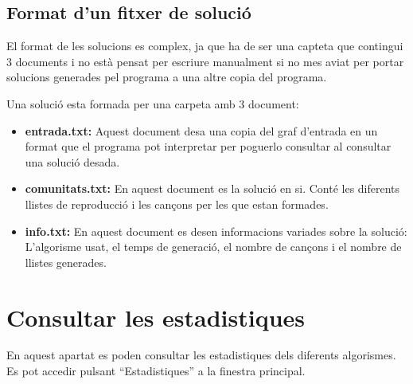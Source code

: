 \documentclass[letterpaper,10pt,oneside]{sphinxmanual}
\begin{document}
\section{Format d'un fitxer de solució}
\label{consult_hist:format-d-un-fitxer-de-solucio}
El format de les solucions es complex, ja que ha de ser una capteta que contingui 3 documents i no està pensat per escriure manualment si no mes aviat per portar solucions generades pel programa a una altre copia del programa.

Una solució esta formada per una carpeta amb 3 document:
\begin{itemize}
\item {} 
\textbf{entrada.txt:} Aquest document desa una copia del graf d'entrada en un format que el programa pot interpretar per poguerlo consultar al consultar una solució desada.

\item {} 
\textbf{comunitats.txt:} En aquest document es la solució en si. Conté les diferents llistes de reproducció i les cançons per les que estan formades.

\item {} 
\textbf{info.txt:} En aquest document es desen informacions variades sobre la solució: L'algorisme usat, el temps de generació, el nombre de cançons i el nombre de llistes generades.

\end{itemize}


\chapter{Consultar les estadistiques}
\label{consult_estad:consultar-les-estadistiques}\label{consult_estad::doc}
En aquest apartat es poden consultar les estadistiques dels diferents algorismes. Es pot accedir pulsant ``Estadistiques'' a la finestra principal.
\end{document}
